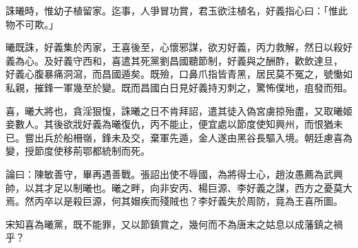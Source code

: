 \begin{pinyinscope}
 誅曦時，惟幼子植留家。迄事，人爭冒功賞，君玉欲注植名，好義指心曰：「惟此物不可欺。」



 曦既誅，好義集於丙家，王喜後至，心懷邪謀，欲刃好義，丙力救解，然日以殺好義為心。及好義守西和，喜遣其死黨劉昌國聽節制，好義與之酬酢，歡飲達旦，
 好義心腹暴痛洞瀉，而昌國遁矣。既殮，口鼻爪指皆青黑，居民莫不冤之，號慟如私親，摧鋒一軍幾至於變。既而昌國白日見好義持刃刺之，驚怖僕地，疽發而殂。



 喜，曦大將也，貪淫狠愎，誅曦之日不肯拜詔，遣其徒入偽宮虜掠殆盡，又取曦姬妾數人。其後欲戕好義為曦復仇，丙不能止，便宜處以節度使知興州，而恨猶未已。嘗出兵於船柵嶺，鋒未及交，棄軍先遁，金人遂由黑谷長驅入境。朝廷慮喜為變，授節度使移荊鄂都統制而死。



 論曰：陳敏善守，畢再遇善戰。張詔出使不辱國，為將得士心，趙汝愚薦為武興帥，以其才足以制曦也。曦之畔，向非安丙、楊巨源、李好義之謀，西方之憂莫大焉。然丙卒以是殺巨源，何其媢疾而殘賊也？李好義失於周防，竟為王喜所圖。



 宋知喜為曦黨，既不能罪，又以節鎮賞之，幾何而不為唐末之姑息以成藩鎮之禍乎？



\end{pinyinscope}